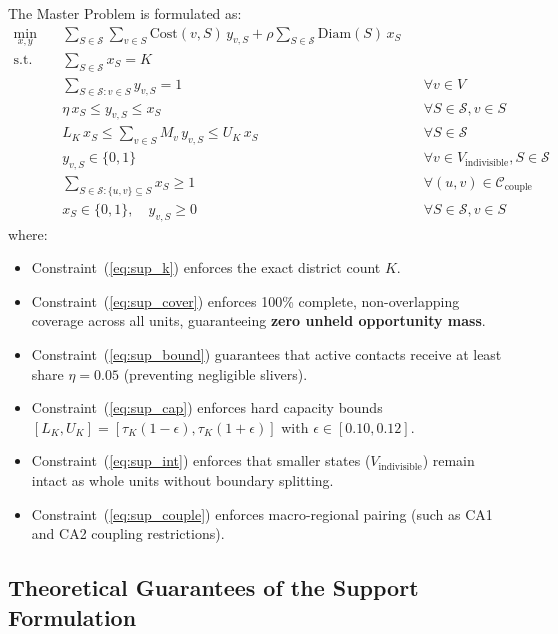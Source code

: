 \documentclass[11pt,a4paper]{article}
\theoremstyle{plain}
\theoremstyle{definition}
\begin{document}
The Master Problem is formulated as:
\begin{align}
    \min_{x, y} \quad & \sum_{S \in \mathcal{S}} \sum_{v \in S} \text{Cost}(v, S) \, y_{v, S} + \rho \sum_{S \in \mathcal{S}} \text{Diam}(S) \, x_S \label{eq:sup_obj} \\
    \text{s.t.} \quad & \sum_{S \in \mathcal{S}} x_S = K \label{eq:sup_k} \\
    & \sum_{S \in \mathcal{S} : v \in S} y_{v, S} = 1 && \forall v \in V \label{eq:sup_cover} \\
    & \eta \, x_S \le y_{v, S} \le x_S && \forall S \in \mathcal{S}, v \in S \label{eq:sup_bound} \\
    & L_K \, x_S \le \sum_{v \in S} M_v \, y_{v, S} \le U_K \, x_S && \forall S \in \mathcal{S} \label{eq:sup_cap} \\
    & y_{v, S} \in \{0, 1\} && \forall v \in V_{\text{indivisible}}, S \in \mathcal{S} \label{eq:sup_int} \\
    & \sum_{S \in \mathcal{S} : \{u, v\} \subseteq S} x_S \ge 1 && \forall (u, v) \in \mathcal{C}_{\text{couple}} \label{eq:sup_couple} \\
    & x_S \in \{0, 1\}, \quad y_{v, S} \ge 0 && \forall S \in \mathcal{S}, v \in S \label{eq:sup_vars}
\end{align}
where:
\begin{itemize}[leftmargin=1.5em]
    \item Constraint~(\ref{eq:sup_k}) enforces the exact district count $K$.
    \item Constraint~(\ref{eq:sup_cover}) enforces 100\% complete, non-overlapping coverage across all units, guaranteeing \textbf{zero unheld opportunity mass}.
    \item Constraint~(\ref{eq:sup_bound}) guarantees that active contacts receive at least share $\eta = 0.05$ (preventing negligible slivers).
    \item Constraint~(\ref{eq:sup_cap}) enforces hard capacity bounds $[L_K, U_K] = [\tau_K(1 - \epsilon), \tau_K(1 + \epsilon)]$ with $\epsilon \in [0.10, 0.12]$.
    \item Constraint~(\ref{eq:sup_int}) enforces that smaller states ($V_{\text{indivisible}}$) remain intact as whole units without boundary splitting.
    \item Constraint~(\ref{eq:sup_couple}) enforces macro-regional pairing (such as CA1 and CA2 coupling restrictions).
\end{itemize}

\subsection{Theoretical Guarantees of the Support Formulation}
\end{document}
